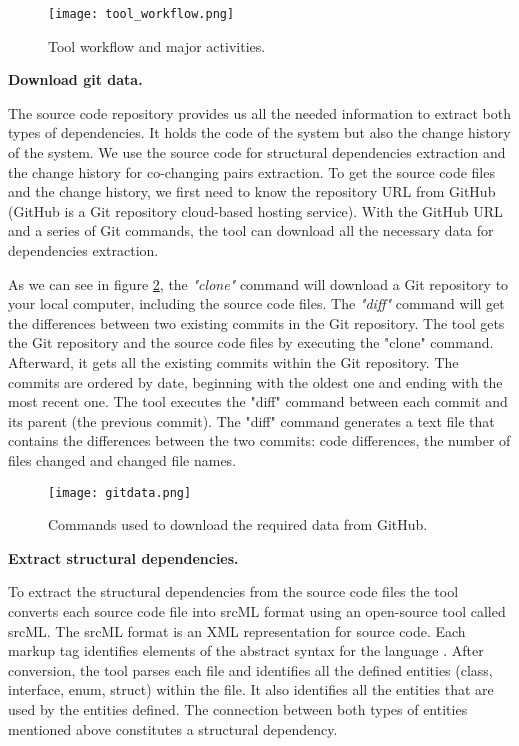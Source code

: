 \begin{figure}[H]
\centering
\texttt{[image: tool\_workflow.png]}
\caption{Tool workflow and major activities.}
\label{fig:figworkflow}
\end{figure}


\textbf{Download git data.}

The source code repository provides us all the needed information to extract both types of dependencies. It holds the code of the system but also the change history of the system. We use the source code for structural dependencies extraction and the change history for co-changing pairs extraction.
To get the source code files and the change history, we first need to know the repository URL from GitHub (GitHub is a Git repository cloud-based hosting service). With the GitHub URL and a series of Git commands, the tool can download all the necessary data for dependencies extraction.

As we can see in figure \ref{fig:figgitdata}, the \textit{"clone"} command will download a Git repository to your local computer, including the source code files. The \textit{"diff"} command will get the differences between two existing commits in the Git repository. 
The tool gets the Git repository and the source code files by executing the "clone" command. Afterward, it gets all the existing commits within the Git repository. The commits are ordered by date, beginning with the oldest one and ending with the most recent one. The tool executes the "diff" command between each commit and its parent (the previous commit). The "diff" command generates a text file that contains the differences between the two commits: code differences, the number of files changed and changed file names.


\begin{figure}[H]
\centering
\texttt{[image: gitdata.png]}
\caption{Commands used to download the required data from GitHub.}
\label{fig:figgitdata}
\end{figure}

\textbf{Extract structural dependencies.}

To extract the structural dependencies from the source code files the tool converts each source code file into srcML format using an open-source tool called srcML. The srcML format is an XML representation for source code. Each markup tag identifies elements of the abstract syntax for the language \cite{srcML}. 
After conversion, the tool parses each file and identifies all the defined entities (class, interface, enum, struct) within the file. It also identifies all the entities that are used by the entities defined.  The connection between both types of entities mentioned above constitutes a structural dependency.

